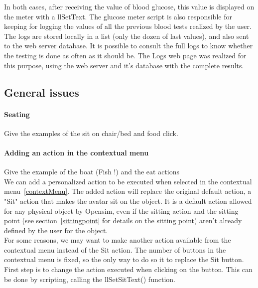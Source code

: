 In both cases, after receiving the value of blood glucose, this value is displayed on the meter with a llSetText.  The glucose meter script is also responsible for keeping for logging the values of all the previous blood tests realized by the user. The logs are stored locally in a list (only the dozen of last values), and also sent to the web server database. 
It is possible to consult the full logs to know whether the testing is done as often as it should be. The Logs web page was realized for this purpose, using the web server and it's database with the complete results.
\subsection{General issues}


	\paragraph{Seating}
		\label{sec:seat}
Give the examples of the sit on chair/bed and food click.
		
	\paragraph{Adding an action in the contextual menu}
	\label{sec:menuAction}
Give the example of the boat (Fish !) and the eat actions\\
We can add a personalized action to be executed when selected in the contextual menu~\ref{contextMenu}. The added action will replace the original default action, a "Sit" action that makes the avatar sit on the object. It is a default action allowed for any physical object by Opensim, even if the sitting action and the sitting point (see section~\ref{sittingpoint} for details on the sitting point) aren't already defined by the user for the object. 
\\For some reasons, we may want to make another action available from the contextual menu instead of the Sit action. The number of buttons in the contextual menu is fixed, so the only way to do so it to replace the Sit button. First step is to change the action executed when clicking on the button. This can be done by scripting, calling the llSetSitText() function. 

